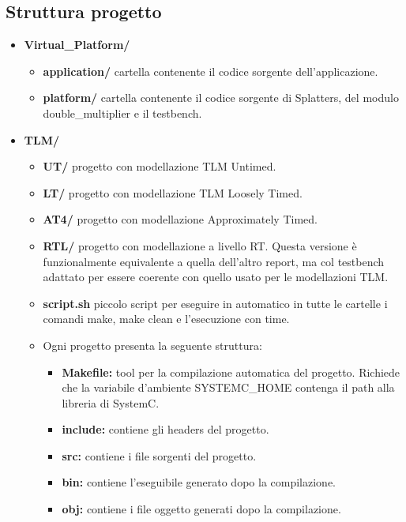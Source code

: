 \documentclass[]{IEEEtran}
\begin{document}
\subsection{Struttura progetto}
\begin{itemize}
    \item \textbf{Virtual\_Platform/}
          \begin{itemize}
              \item \textbf{application/} cartella contenente il codice sorgente dell'applicazione.
              \item \textbf{platform/} cartella contenente il codice sorgente di Splatters, del modulo double\_multiplier e il testbench.
          \end{itemize}
    \item \textbf{TLM/}
          \begin{itemize}
              \item \textbf{UT/} progetto con modellazione TLM Untimed.
              \item \textbf{LT/} progetto con modellazione TLM Loosely Timed.
              \item \textbf{AT4/} progetto con modellazione Approximately Timed.
              \item \textbf{RTL/} progetto con modellazione a livello RT. Questa versione è funzionalmente equivalente a quella dell'altro report, ma col testbench adattato per essere coerente con quello usato per le modellazioni TLM.
              \item \textbf{script.sh} piccolo script per eseguire in automatico in tutte le cartelle i comandi make, make clean e l'esecuzione con time.
              \item Ogni progetto presenta la seguente struttura:
                    \begin{itemize}
                        \item \textbf{Makefile:} tool per la compilazione automatica del progetto. Richiede che la variabile d'ambiente SYSTEMC\_HOME contenga il path alla libreria di SystemC.
                        \item \textbf{include:} contiene gli headers del progetto.
                        \item \textbf{src:} contiene i file sorgenti del progetto.
                        \item \textbf{bin:} contiene l'eseguibile generato dopo la compilazione.
                        \item \textbf{obj:} contiene i file oggetto generati dopo la compilazione.
                    \end{itemize}
          \end{itemize}
\end{itemize}
\end{document}
